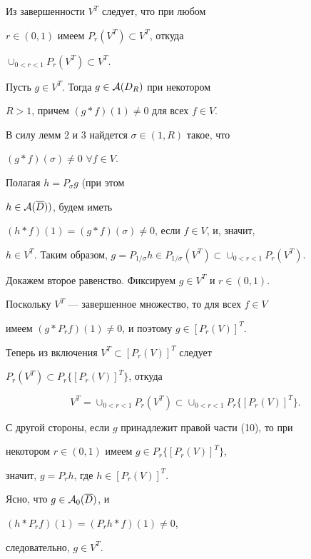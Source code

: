 \begin{pf}


Из завершенности $V^T$ следует, что при любом 


$r\in (0,1)$ имеем $P_r (V^T )\subset V^T$, откуда 


$\cup_{0<r<1} P_r (V^T ) \subset V^T$. 


Пусть $g\in V^T$. Тогда $g\in {\cal A}(D_R )$ при некотором 


$R>1$, причем $(g*f)(1) \neq 0$ для всех $f\in V$. 


В силу лемм 2 и 3 найдется $\sigma \in (1,R)$ такое, что 


$(g*f)(\sigma) \neq 0$ $\forall f\in V$. 


Полагая $h= P_{\sigma} g$ (при этом 


$h\in {\cal A}(\overline{D}))$, будем иметь 


$(h*f)(1)=(g*f)(\sigma) \neq 0$, если $f\in V$, и, значит, 


$h\in V^T$. Таким образом, $g = P_{1/\sigma} h 


\in P_{1/\sigma} (V^T) \subset \cup_{0<r<1} P_r (V^T)$.


Докажем второе равенство. Фиксируем $g\in V^T$ и $r \in (0,1)$. 


Поскольку $V^T$ --- завершенное множество, то для всех $f \in V$


имеем $(g*P_r f)(1) \neq 0$, и поэтому $g\in [P_r (V)]^T$. 


Теперь из включения $V^T \subset [P_r (V)]^T$ следует


$P_r (V^T ) \subset P_r \{ [P_r (V)]^T \}$, откуда 


$$


V^T = \cup_{0<r<1} P_r (V^T ) \subset 


\cup_{0<r<1} P_r \{ [P_r (V)]^T \}.


$$


С другой стороны, если $g$ принадлежит правой части (10), то при 


некотором $r\in (0,1)$ имеем $g \in P_r \{ [P_r (V)]^T \}$, 


значит, $g=P_r h$, где $h \in [P_r (V)]^T$. 


Ясно, что $g \in {\cal A}_0(\overline{D})$, и 


$(h*P_r f)(1) = (P_r h*f)(1) \neq 0$, 


следовательно, $g\in V^T$.


\end{pf}





